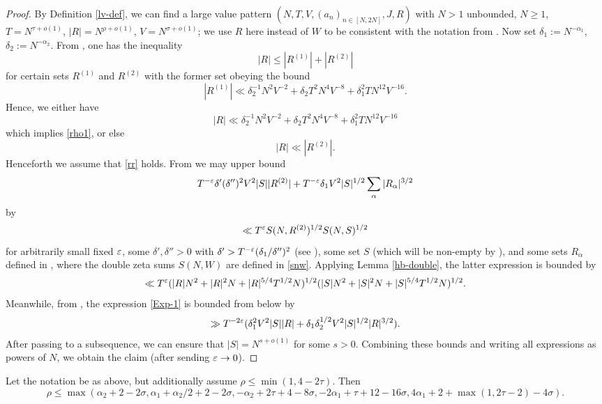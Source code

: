\begin{proof}  By Definition \ref{lv-def}, we can find a large value pattern $(N,T,V,(a_n)_{n \in [N,2N]},J,R)$ with $N>1$ unbounded, $N \geq 1$, $T = N^{\tau+o(1)}$, $|R| = N^{\rho+o(1)}$, $V = N^{\sigma+o(1)}$; we use $R$ here instead of $W$ to be consistent with the notation from \cite{bourgain_large_2000}.  Now set $\delta_1 := N^{-\alpha_1}$, $\delta_2 := N^{-\alpha_2}$.  From \cite[(4.41), (4.42)]{bourgain_large_2000}, one has the inequality
    $$ |R| \leq |R^{(1)}| + |R^{(2)}|$$
    for certain sets $R^{(1)}$ and $R^{(2)}$ with the former set obeying the bound
$$ |R^{(1)}| \ll \delta_2^{-1} N^2 V^{-2} + \delta_2 T^2 N^4 V^{-8} + \delta_1^2 T N^{12} V^{-16}.$$
Hence, we either have
$$ |R| \ll \delta_2^{-1} N^2 V^{-2} + \delta_2 T^2 N^4 V^{-8} + \delta_1^2 T N^{12} V^{-16}$$
which implies \eqref{rho1}, or else
\begin{equation}\label{rr}
    |R| \ll |R^{(2)}|.
\end{equation}
Henceforth we assume that \eqref{rr} holds. From \cite[(4.53), (4.54)]{bourgain_large_2000} we may upper bound
\begin{equation}\label{Exp-1}
     T^{-\varepsilon} \delta' (\delta'')^2 V^2 |S| |R^{(2)}| + T^{-\varepsilon} \delta_1 V^2 |S|^{1/2} \sum_\alpha |R_\alpha|^{3/2}
\end{equation}
by
\begin{equation}\label{Exp-2}
    \ll T^\varepsilon S(N,R^{(2)})^{1/2} S(N,S)^{1/2}
\end{equation}
for arbitrarily small fixed $\varepsilon$, some $\delta',\delta''>0$ with $\delta' > T^{-\varepsilon} (\delta_1/\delta'')^2$ (see \cite[(4.37)]{bourgain_large_2000}), some set $S$ (which will be non-empty by \cite[(4.47)]{bourgain_large_2000}), and some sets $R_\alpha$ defined in \cite[(4.39)]{bourgain_2000}, where the double zeta sums $S(N,W)$ are defined in \eqref{snw}.  Applying Lemma \ref{hb-double}, the latter expression is bounded by
$$ \ll T^\varepsilon (|R|N^2 + |R|^2 N + |R|^{5/4} T^{1/2} N)^{1/2} (|S| N^2 + |S|^2 N + |S|^{5/4} T^{1/2} N)^{1/2}.$$
Meanwhile, from \cite[(4.57)]{bourgain_large_2000}, the expression \eqref{Exp-1} is bounded from below by
$$ \gg T^{-2\varepsilon} (\delta_1^2 V^2 |S| |R| + \delta_1 \delta_2^{1/2} V^2 |S|^{1/2} |R|^{3/2}).$$
After passing to a subsequence, we can ensure that $|S| = N^{s+o(1)}$ for some $s > 0$.
Combining these bounds and writing all expressions as powers of $N$, we obtain the claim (after sending $\varepsilon \to 0$).
\end{proof}

\begin{corollary}\label{borg-lv-simp} \cite[Lemma 4.60]{bourgain_large_2000} Let the notation be as above, but additionally assume $\rho \leq \min(1, 4-2\tau)$.  Then
$$ \rho \leq \max( \alpha_2 + 2 - 2 \sigma, \alpha_1+\alpha_2/2 + 2-2\sigma, -\alpha_2 + 2\tau+4-8\sigma, -2\alpha_1 + \tau + 12 - 16 \sigma, 4\alpha_1 + 2+\max(1,2\tau-2)-4\sigma).$$
\end{corollary}


